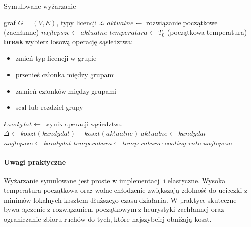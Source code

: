\begin{algorithm}[H]
\caption{Symulowane wyżarzanie}
\label{alg:sa}
\begin{algorithmic}[1]
\Require graf $G=(V,E)$, typy licencji $\mathcal{L}$
\State $aktualne \gets$ rozwiązanie początkowe (zachłanne)
\State $najlepsze \gets aktualne$
\State $temperatura \gets T_0$ (początkowa temperatura)
   \textbf{break} \EndIf
  \State wybierz losową operację sąsiedztwa:
  \begin{itemize}[noitemsep]
    \item zmień typ licencji w grupie
    \item przenieś członka między grupami
    \item zamień członków między grupami
    \item scal lub rozdziel grupy
  \end{itemize}
  \State $kandydat \gets$ wynik operacji sąsiedztwa
  \State $\Delta \gets koszt(kandydat) - koszt(aktualne)$
    \State $aktualne \gets kandydat$
      \State $najlepsze \gets kandydat$
    \EndIf
  \EndIf
  \State $temperatura \gets temperatura \cdot cooling\_rate$
\EndFor
\State \Return $najlepsze$
\end{algorithmic}
\end{algorithm}

\paragraph{Uwagi praktyczne}
Wyżarzanie symulowane jest proste w implementacji i elastyczne. Wysoka temperatura początkowa oraz wolne chłodzenie zwiększają zdolność do ucieczki z minimów lokalnych kosztem dłuższego czasu działania. W praktyce skuteczne bywa łączenie z rozwiązaniem początkowym z heurystyki zachłannej oraz ograniczanie zbioru ruchów do tych, które najszybciej obniżają koszt.
